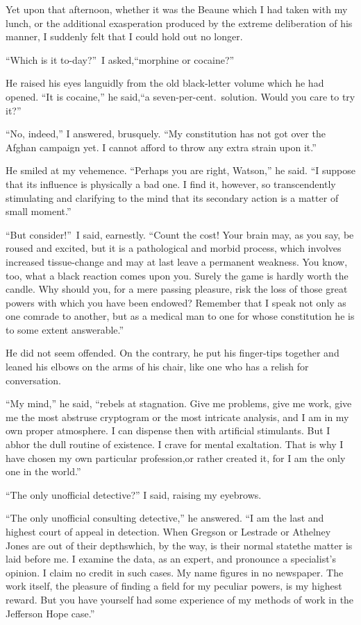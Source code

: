 \documentclass[12pt,english,oneside]{book}
\begin{document}
Yet upon that afternoon, whether it was the Beaune which I had taken
with my lunch, or the additional exasperation produced by the extreme
deliberation of his manner, I suddenly felt that I could hold out
no longer.

{}``Which is it to-day?''\ I asked,\mdsh{---}``morphine or cocaine?''

He raised his eyes languidly from the old black-letter volume which
he had opened. {}``It is cocaine,'' he said,\mdsh{---}``a seven-per-cent.\ solution.
Would you care to try it?''

{}``No, indeed,'' I answered, brusquely. {}``My constitution has
not got over the Afghan campaign yet. I cannot afford to throw any
extra strain upon it.''

He smiled at my vehemence. {}``Perhaps you are right, Watson,''
he said. {}``I suppose that its influence is physically a bad one.
I find it, however, so transcendently stimulating and clarifying to
the mind that its secondary action is a matter of small moment.''

{}``But consider!''\ I said, earnestly. {}``Count the cost! Your
brain may, as you say, be roused and excited, but it is a pathological
and morbid process, which involves increased tissue-change and may
at last leave a permanent weakness. You know, too, what a black reaction
comes upon you. Surely the game is hardly worth the candle. Why should
you, for a mere passing pleasure, risk the loss of those great powers
with which you have been endowed? Remember that I speak not only as
one comrade to another, but as a medical man to one for whose constitution
he is to some extent answerable.''

He did not seem offended. On the contrary, he put his finger-tips
together and leaned his elbows on the arms of his chair, like one
who has a relish for conversation.

{}``My mind,'' he said, {}``rebels at stagnation. Give me problems,
give me work, give me the most abstruse cryptogram or the most intricate
analysis, and I am in my own proper atmosphere. I can dispense then
with artificial stimulants. But I abhor the dull routine of existence.
I crave for mental exaltation. That is why I have chosen my own particular
profession,\mdsh{---}or rather created it, for I am the only one
in the world.''

{}``The only unofficial detective?'' I said, raising my eyebrows.

{}``The only unofficial consulting detective,'' he answered. {}``I
am the last and highest court of appeal in detection. When Gregson
or Lestrade or Athelney Jones are out of their depths\mdsh{---}which,
by the way, is their normal state\mdsh{---}the matter is laid before
me. I examine the data, as an expert, and pronounce a specialist's
opinion. I claim no credit in such cases. My name figures in no newspaper.
The work itself, the pleasure of finding a field for my peculiar powers,
is my highest reward. But you have yourself had some experience of
my methods of work in the Jefferson Hope case.''
\end{document}
